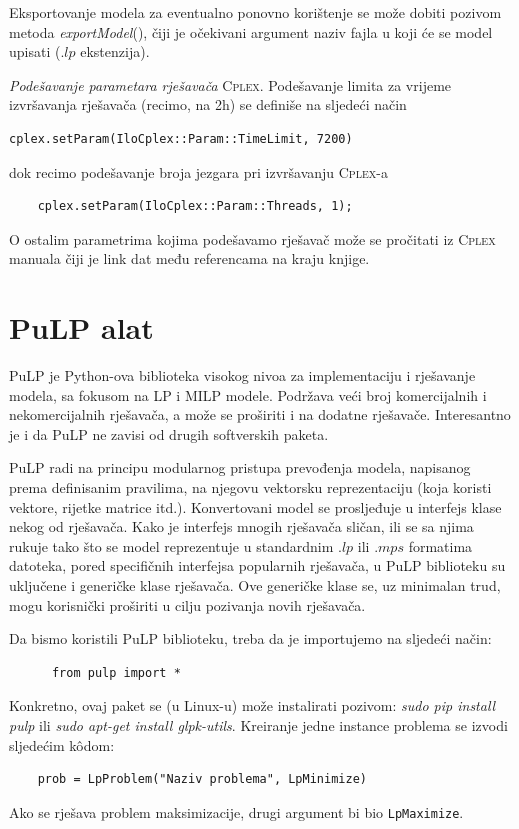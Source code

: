 \documentclass[a4paper, utf8, 11pt, colorlinks]{book}
\theoremstyle{definition}
\begin{document}
Eksportovanje modela za eventualno ponovno korištenje se može dobiti pozivom metoda \emph{exportModel}(), čiji je očekivani argument naziv fajla u koji će se model upisati (.$lp$ ekstenzija).  

\emph{ {Podešavanje parametara rješavača}} \textrm{\textsc{Cplex}}. Podešavanje limita za vrijeme izvršavanja rješavača (recimo, na 2h) se definiše na sljedeći način
\begin{verbatim}
cplex.setParam(IloCplex::Param::TimeLimit, 7200)
\end{verbatim}
dok recimo podešavanje broja jezgara pri izvršavanju \textsc{Cplex}-a 
\begin{verbatim}
	cplex.setParam(IloCplex::Param::Threads, 1);
\end{verbatim}
O ostalim parametrima kojima podešavamo rješavač može se pročitati iz \textrm{\textsc{Cplex}} manuala čiji je link dat  među referencama na kraju knjige.
 \section{PuLP alat}
 PuLP je Python-ova biblioteka visokog nivoa za implementaciju i rješavanje modela, sa fokusom na LP i MILP modele.   Podržava veći broj komercijalnih i nekomercijalnih rješavača, a može se proširiti i na dodatne rješavače. Interesantno je i da PuLP  ne zavisi od  drugih softverskih paketa. 
 
 PuLP radi na principu modularnog pristupa prevođenja modela, napisanog prema definisanim pravilima, na njegovu vektorsku reprezentaciju (koja koristi vektore, rijetke matrice itd.). Konvertovani model se prosljeđuje u interfejs klase nekog od rješavača. Kako je interfejs mnogih rješavača sličan, ili se sa njima rukuje tako što se model reprezentuje u standardnim .$lp$ ili .$mps$  formatima  datoteka, pored specifičnih interfejsa popularnih rješavača, u PuLP biblioteku su uključene i  generičke klase rješavača. %
  Ove generičke klase se, uz minimalan trud, mogu korisnički proširiti u cilju pozivanja novih rješavača.    
 
 Da bismo koristili PuLP biblioteku, treba da je importujemo na sljedeći način:
 \begin{verbatim}
 	  from pulp import *
 \end{verbatim}
 Konkretno, ovaj paket se (u Linux-u) može instalirati pozivom: \emph{sudo pip install pulp} ili \emph{sudo apt-get install glpk-utils}. 
 Kreiranje jedne instance problema se izvodi sljedećim k\^odom:
 \begin{verbatim}
 	prob = LpProblem("Naziv problema", LpMinimize)
 \end{verbatim}
 Ako se rješava problem maksimizacije, drugi argument bi  bio \texttt{LpMaximize}. 
\end{document}

